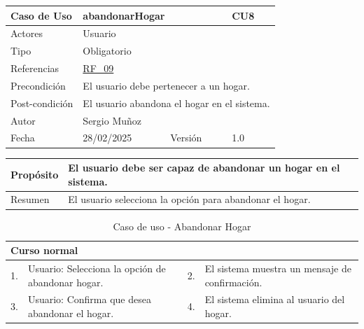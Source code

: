 \begin{table}[H]
    \centering
    \begin{tabular}{| m{} | m{} | m{} | m{} |}
        \hline
        \rowcolor[HTML]{C0C0C0} Caso de Uso & \multicolumn{2}{|m{0.43\textwidth}|}{abandonarHogar} &  CU8\\ 
        \hline
        Actores & \multicolumn{3}{l|}{Usuario} \\ 
        \hline
        Tipo & \multicolumn{3}{l|}{Obligatorio} \\ 
        \hline
        Referencias & \multicolumn{3}{l|}{\hyperref[req:RF09]{RF\_09}} \\ 
        \hline
        Precondición & \multicolumn{3}{l|}{El usuario debe pertenecer a un hogar.} \\ 
        \hline
        Post-condición & \multicolumn{3}{l|}{El usuario abandona el hogar en el sistema.} \\ 
        \hline
        Autor & \multicolumn{3}{l|}{Sergio Muñoz} \\ 
        \hline
        Fecha & 28/02/2025 & Versión & 1.0 \\ 
        \hline
    \end{tabular}
\end{table}

\begin{table}[H]
    \centering
    \begin{tabular}{| m{} | m{} | m{} | m{} |}
        \hline
        Propósito & \multicolumn{3}{m{0.67\textwidth}|}{El usuario debe ser capaz de abandonar un hogar en el sistema.} \\ 
        \hline
        Resumen & \multicolumn{3}{m{0.67\textwidth}|}{El usuario selecciona la opción para abandonar el hogar.} \\ 
        \hline
    \end{tabular}
\end{table}



\begin{table}[H]
    \centering
    \begin{tabular}{| m{} | m{} | m{} | m{} |}
        \hline
        \multicolumn{4}{|m{0.9\textwidth}|}{Curso normal} \\ 
        \hline
        1. & Usuario: Selecciona la opción de abandonar hogar. 
        & 2. & El sistema muestra un mensaje de confirmación. \\ 
        \hline
        3. & Usuario: Confirma que desea abandonar el hogar. 
        & 4. & El sistema elimina al usuario del hogar. \\ 
        \hline
    \end{tabular}
    \caption{Caso de uso - Abandonar Hogar}
\end{table}

